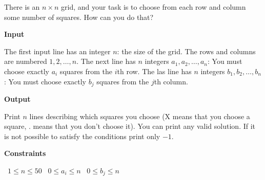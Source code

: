 There is an $n \times n$ grid, and your task is to choose from each row and column some number of squares. How can you do that?

\vspace{0.3cm}\noindent\textbf{Input}

The first input line has an integer $n$: the size of the grid. The rows and columns are numbered $1,2,\dots,n$.
The next line has $n$ integers $a_1,a_2,\ldots,a_n$: You must choose exactly $a_i$ squares from the $i$th row.
The las line has $n$ integers $b_1,b_2,\ldots,b_n$: You must choose exactly $b_j$ squares from the $j$th column.

\vspace{0.3cm}\noindent\textbf{Output}

Print $n$ lines describing which squares you choose (X means that you choose a square, . means that you don't choose it). You can print any valid solution.
If it is not possible to satisfy the conditions print only $-1$.

\vspace{0.3cm}\noindent\textbf{Constraints}

\textbullet\ $1 \le n \le 50$
\textbullet\ $0 \le a_i \le n$
\textbullet\ $0 \le b_j \le n$